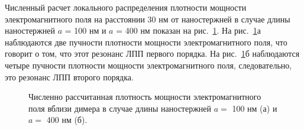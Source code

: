 Численный расчет локального распределения плотности мощности электромагнитного поля на расстоянии 30 нм от наностержней в случае длины наностержней $ a $ = 100 нм и $ a $ = 400 нм показан на рис.~\ref{img:localfield2}. На рис.~\ref{img:localfield2}а наблюдаются две пучности плотности мощности электромагнитного поля, что говорит о том, что этот резонанс ЛПП первого порядка. На рис.~\ref{img:localfield2}б наблюдаются четыре пучности плотности мощности электромагнитного поля, следовательно, это резонанс ЛПП второго порядка.
\begin{figure}
\caption{Численно рассчитанная плотность мощности электромагнитного поля вблизи димера в случае длины наностержней $ a = $ 100 нм (а) и $ a = $ 400 нм (б).}
\label{img:localfield2}
\end{figure}



